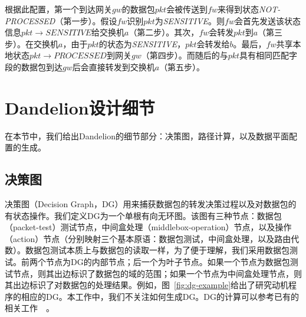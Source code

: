 
根据此配置，第一个到达网关$gw$的数据包$pkt$会被传送到$fw$来得到状态\emph{NOT-PROCESSED}（第一步）。假设$fw$识别$pkt$为\emph{SENSITIVE}。则$fw$会首先发送该状态信息$pkt \rightarrow SENSITIVE$给交换机$a$（第二步）。其次，$fw$会转发$pkt$到$a$（第三步）。在交换机$a$，由于$pkt$的状态为\emph{SENSITIVE}，$pkt$会转发给$b$。最后，$fw$共享本地状态$pkt \rightarrow PROCESSED$到网关$gw$（第四步）。而随后的与$pkt$具有相同匹配字段的数据包到达$gw$后会直接转发到交换机$a$（第五步）。



\section{Dandelion设计细节}

在本节中，我们给出Dandelion的细节部分：决策图，路径计算，以及数据平面配置的生成。


\subsection{决策图}

决策图（Decision Graph，DG）用来捕获数据包的转发决策过程以及对数据包的有状态操作。我们定义DG为一个单根有向无环图。该图有三种节点：数据包（packet-test）测试节点，中间盒处理（middlebox-operation）节点，以及操作（action）节点（分别映射三个基本原语：数据包测试，中间盒处理，以及路由代数）。数据包测试本质上与数据包的读取一样，为了便于理解，我们采用数据包测试。前两个节点为DG的内部节点；后一个为叶子节点。如果一个节点为数据包测试节点，则其出边标识了数据包的域的范围；如果一个节点为中间盒处理节点，则其出边标识了对数据包的处理结果。例如，图~\ref{fig:dg-example}给出了研究动机程序的相应的DG。本工作中，我们不关注如何生成DG。DG的计算可以参考已有的相关工作~\cite{arashloo2016snap}~\cite{smolka2015fast}。

